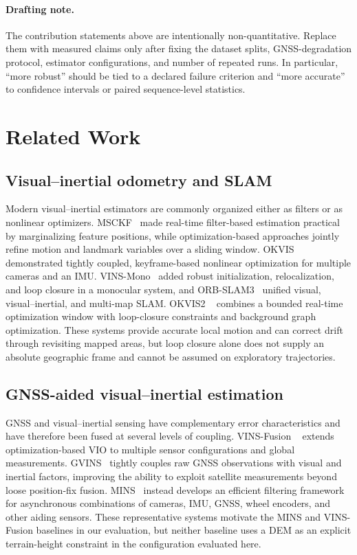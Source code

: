 \paragraph{Drafting note.}
The contribution statements above are intentionally non-quantitative. Replace
them with measured claims only after fixing the dataset splits, GNSS-degradation
protocol, estimator configurations, and number of repeated runs. In particular,
``more robust'' should be tied to a declared failure criterion and ``more
accurate'' to confidence intervals or paired sequence-level statistics.

\section{Related Work}
\label{sec:related_work}

\subsection{Visual--inertial odometry and SLAM}

Modern visual--inertial estimators are commonly organized either as filters or
as nonlinear optimizers. MSCKF~\cite{mourikis2007msckf} made real-time
filter-based estimation practical by marginalizing feature positions, while
optimization-based approaches jointly refine motion and landmark variables over
a sliding window. OKVIS~\cite{leutenegger2015okvis} demonstrated tightly coupled,
keyframe-based nonlinear optimization for multiple cameras and an IMU.
VINS-Mono~\cite{qin2018vinsmono} added robust initialization, relocalization,
and loop closure in a monocular system, and ORB-SLAM3~\cite{campos2021orbslam3}
unified visual, visual--inertial, and multi-map SLAM. OKVIS2
~\cite{boche2022okvis2} combines a bounded real-time optimization window with
loop-closure constraints and background graph optimization. These systems
provide accurate local motion and can correct drift through revisiting mapped
areas, but loop closure alone does not supply an absolute geographic frame and
cannot be assumed on exploratory trajectories.

\subsection{GNSS-aided visual--inertial estimation}

GNSS and visual--inertial sensing have complementary error characteristics and
have therefore been fused at several levels of coupling. VINS-Fusion
~\cite{qin2019vinsfusion} extends optimization-based VIO to multiple sensor
configurations and global measurements. GVINS~\cite{cao2022gvins} tightly
couples raw GNSS observations with visual and inertial factors, improving the
ability to exploit satellite measurements beyond loose position-fix fusion.
MINS~\cite{geneva2020mins} instead develops an efficient filtering framework
for asynchronous combinations of cameras, IMU, GNSS, wheel encoders, and other
aiding sensors. These representative systems motivate the MINS and
VINS-Fusion baselines in our evaluation, but neither baseline uses a DEM as an
explicit terrain-height constraint in the configuration evaluated here.

